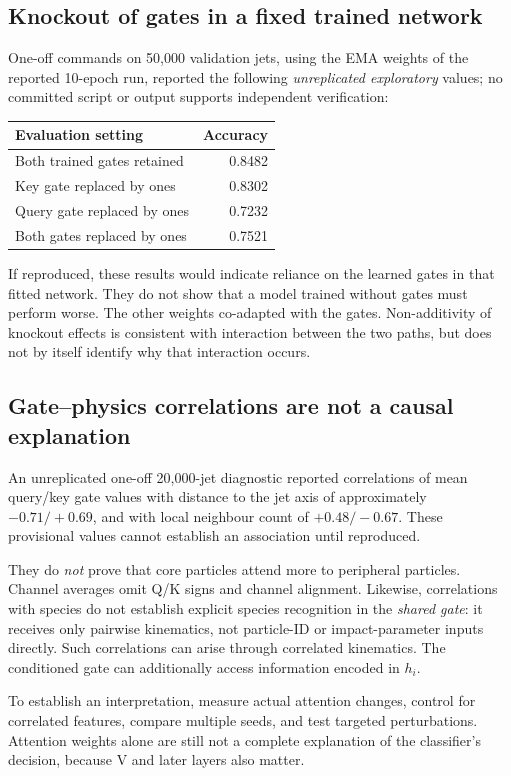 \documentclass[11pt,a4paper]{article}
\numberwithin{equation}{section}
\begin{document}
\subsection{Knockout of gates in a fixed trained network}
One-off commands on 50,000 validation jets, using the EMA weights of the
reported 10-epoch run, reported the following \emph{unreplicated exploratory}
values; no committed script or output supports independent verification:
\begin{center}
\begin{tabular}{lr}
\toprule Evaluation setting & Accuracy\\ \midrule
Both trained gates retained & 0.8482\\
Key gate replaced by ones & 0.8302\\
Query gate replaced by ones & 0.7232\\
Both gates replaced by ones & 0.7521\\
\bottomrule
\end{tabular}
\end{center}
If reproduced, these results would indicate reliance on the learned gates in that fitted network.
They do not show that a model trained without gates must perform worse.
The other weights co-adapted with the gates.
Non-additivity of knockout effects is consistent with interaction between
the two paths, but does not by itself identify why that interaction occurs.

\subsection{Gate--physics correlations are not a causal explanation}
An unreplicated one-off 20,000-jet diagnostic reported correlations of mean query/key gate values
with distance to the jet axis of approximately $-0.71/+0.69$, and with
local neighbour count of $+0.48/-0.67$.
These provisional values cannot establish an association until reproduced.

They do \emph{not} prove that core particles attend more to peripheral
particles. Channel averages omit Q/K signs and channel alignment.
Likewise, correlations with species do not establish explicit species
recognition in the \emph{shared gate}: it receives only pairwise kinematics,
not particle-ID or impact-parameter inputs directly.
Such correlations can arise through correlated kinematics.
The conditioned gate can additionally access information encoded in $h_i$.

To establish an interpretation, measure actual attention changes, control
for correlated features, compare multiple seeds, and test targeted
perturbations. Attention weights alone are still not a complete explanation
of the classifier's decision, because V and later layers also matter.
\end{document}
